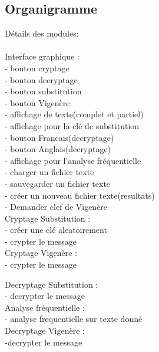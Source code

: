 \documentclass[a4]{article}
\begin{document}
		\subsection{Organigramme}
Détails des modules:\\ \\
		Interface graphique :\\
			- bouton cryptage\\
			- bouton decryptage\\
			- bouton substitution\\
			- bouton Vigenère\\
			- affichage de texte(complet et partiel)\\
			- affichage pour la clé de substitution\\
			- bouton Francais(decryptage)\\
			- bouton Anglais(decryptage)\\
			- affichage pour l'analyse fréquentielle\\
			- charger un fichier texte\\
			- sauvegarder un fichier texte\\
			- créer un nouveau fichier texte(resultats)\\
			- Demander clef de Vigenère\\
			
		Cryptage Substitution :\\
			- créer une clé aleatoirement\\
			- crypter le message\\
			
		Cryptage Vigenère :\\
			- crypter le message
			
		Decryptage Substitution :\\
			- decrypter le message\\
			
		Analyse fréquentielle :\\
			- analyse frequentielle sur texte donné\\
			
		Decryptage Vigenère :\\
			-decrypter le message
		
		
\end{document}
